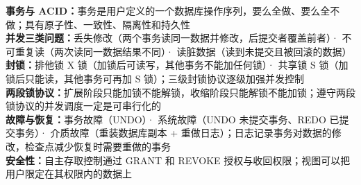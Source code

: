 \documentclass[a4paper,11pt]{article}
\begin{document}

\begin{knowmap}
\textbf{事务与 ACID：}事务是用户定义的一个数据库操作序列，要么全做、要么全不做；具有原子性、一致性、隔离性和持久性\\[2pt]
\textbf{并发三类问题：}丢失修改（两个事务读同一数据并修改，后提交者覆盖前者）· 不可重复读（两次读同一数据结果不同）· 读脏数据（读到未提交且被回滚的数据）\\[2pt]
\textbf{封锁：}排他锁 X 锁（加锁后可读写，其他事务不能加任何锁）· 共享锁 S 锁（加锁后只能读，其他事务可再加 S 锁）；三级封锁协议逐级加强并发控制\\[2pt]
\textbf{两段锁协议：}扩展阶段只能加锁不能解锁，收缩阶段只能解锁不能加锁；遵守两段锁协议的并发调度一定是可串行化的\\[2pt]
\textbf{故障与恢复：}事务故障（UNDO）· 系统故障（UNDO 未提交事务、REDO 已提交事务）· 介质故障（重装数据库副本 + 重做日志）；日志记录事务对数据的修改，检查点减少恢复时需要重做的事务\\[2pt]
\textbf{安全性：}自主存取控制通过 GRANT 和 REVOKE 授权与收回权限；视图可以把用户限定在其权限内的数据上
\end{knowmap}
\end{document}

